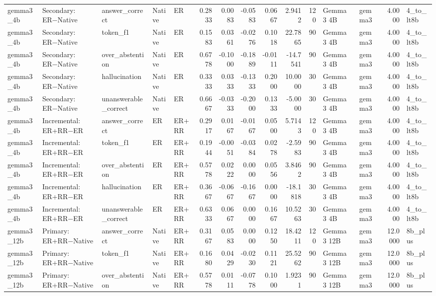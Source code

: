 \begin{tabular}{lllllrrrrrrllrl}
gemma3_4b & Secondary: ER−Native & answer_correct & Native & ER & 0.2833 & 0.0083 & -0.0583 & 0.0667 & 2.9412 & 120 & Gemma 3 4B & gemma3 & 4.0000 & 4_to_lt8b \\
gemma3_4b & Secondary: ER−Native & token_f1 & Native & ER & 0.1583 & 0.0361 & -0.0276 & 0.1018 & 22.7865 & 90 & Gemma 3 4B & gemma3 & 4.0000 & 4_to_lt8b \\
gemma3_4b & Secondary: ER−Native & over_abstention & Native & ER & 0.6778 & -0.1000 & -0.1889 & -0.0111 & -14.7541 & 90 & Gemma 3 4B & gemma3 & 4.0000 & 4_to_lt8b \\
gemma3_4b & Secondary: ER−Native & hallucination & Native & ER & 0.3333 & 0.0333 & -0.1333 & 0.2000 & 10.0000 & 30 & Gemma 3 4B & gemma3 & 4.0000 & 4_to_lt8b \\
gemma3_4b & Secondary: ER−Native & unanswerable_correct & Native & ER & 0.6667 & -0.0333 & -0.2000 & 0.1333 & -5.0000 & 30 & Gemma 3 4B & gemma3 & 4.0000 & 4_to_lt8b \\
gemma3_4b & Incremental: ER+RR−ER & answer_correct & ER & ER+RR & 0.2917 & 0.0167 & -0.0167 & 0.0500 & 5.7143 & 120 & Gemma 3 4B & gemma3 & 4.0000 & 4_to_lt8b \\
gemma3_4b & Incremental: ER+RR−ER & token_f1 & ER & ER+RR & 0.1944 & -0.0051 & -0.0384 & 0.0278 & -2.5983 & 90 & Gemma 3 4B & gemma3 & 4.0000 & 4_to_lt8b \\
gemma3_4b & Incremental: ER+RR−ER & over_abstention & ER & ER+RR & 0.5778 & 0.0222 & 0.0000 & 0.0556 & 3.8462 & 90 & Gemma 3 4B & gemma3 & 4.0000 & 4_to_lt8b \\
gemma3_4b & Incremental: ER+RR−ER & hallucination & ER & ER+RR & 0.3667 & -0.0667 & -0.1667 & 0.0000 & -18.1818 & 30 & Gemma 3 4B & gemma3 & 4.0000 & 4_to_lt8b \\
gemma3_4b & Incremental: ER+RR−ER & unanswerable_correct & ER & ER+RR & 0.6333 & 0.0667 & 0.0000 & 0.1667 & 10.5263 & 30 & Gemma 3 4B & gemma3 & 4.0000 & 4_to_lt8b \\
gemma3_12b & Primary: ER+RR−Native & answer_correct & Native & ER+RR & 0.3167 & 0.0583 & 0.0000 & 0.1250 & 18.4211 & 120 & Gemma 3 12B & gemma3 & 12.0000 & 8b_plus \\
gemma3_12b & Primary: ER+RR−Native & token_f1 & Native & ER+RR & 0.1680 & 0.0429 & -0.0230 & 0.1121 & 25.5262 & 90 & Gemma 3 12B & gemma3 & 12.0000 & 8b_plus \\
gemma3_12b & Primary: ER+RR−Native & over_abstention & Native & ER+RR & 0.5778 & 0.0111 & -0.0778 & 0.1000 & 1.9231 & 90 & Gemma 3 12B & gemma3 & 12.0000 & 8b_plus \\

\end{tabular}
